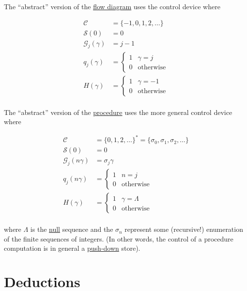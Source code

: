 \documentclass{article}
\begin{document}
The ``abstract'' version of the \underline{flow diagram} uses the control device where

\begin{align*}
    \mathcal{C} &= \{-1, 0, 1, 2, \ldots\} \\
    \mathcal{S}(0) &= 0 \\
    \mathcal{G}_j(\gamma) &= j - 1 \\ 
    q_j(\gamma) & = \begin{cases}
        1 & \gamma = j \\
        0 & \textrm{otherwise}
    \end{cases} \\
    H(\gamma) & = \begin{cases}
        1 & \gamma = -1 \\
        0 & \textrm{otherwise}
    \end{cases} \\
\end{align*}

The ``abstract'' version of the \underline{procedure} uses the more general control device where

\begin{align*}
    \mathcal{C} &= \{0, 1, 2, \ldots \}^{*} = \{\sigma_0, \sigma_1, \sigma_2, \ldots \} \\
    \mathcal{S}(0) &= 0 \\
    \mathcal{G}_j(n\gamma) &= \sigma_j \gamma \\ 
    q_j(n\gamma) & = \begin{cases}
        1 & n = j \\
        0 & \textrm{otherwise}
    \end{cases} \\
    H(\gamma) & = \begin{cases}
        1 & \gamma = \Lambda \\
        0 & \textrm{otherwise}
    \end{cases} \\
\end{align*}

where $\Lambda$ is the \underline{null} sequence and the $\sigma_n$ represent some (recursive!) enumeration of the finite sequences of integers. (In other words, the control of a procedure computation is in general a \underline{push-down} store). 

\section{Deductions}
\end{document}
